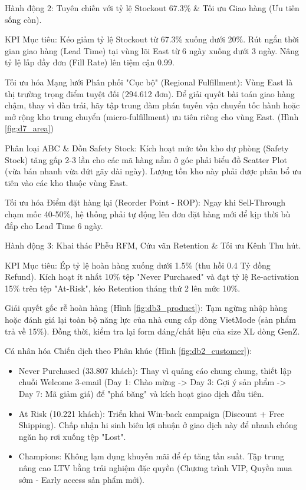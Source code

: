 \documentclass{article}
\begin{document}
Hành động 2: Tuyên chiến với tỷ lệ Stockout 67.3\% \& Tối ưu Giao hàng (Ưu tiên sống còn).

KPI Mục tiêu: Kéo giảm tỷ lệ Stockout từ 67.3\% xuống dưới 20\%. Rút ngắn thời gian giao hàng (Lead Time) tại vùng lõi East từ 6 ngày xuống dưới 3 ngày. Nâng tỷ lệ lấp đầy đơn (Fill Rate) lên tiệm cận 0.99.

Tối ưu hóa Mạng lưới Phân phối "Cục bộ" (Regional Fulfillment): Vùng East là thị trường trọng điểm tuyệt đối (294.612 đơn). Để giải quyết bài toán giao hàng chậm, thay vì dàn trải, hãy tập trung đàm phán tuyến vận chuyển tốc hành hoặc mở rộng kho trung chuyển (micro-fulfillment) ưu tiên riêng cho vùng East. (Hình \ref{fig:d7_area})

Phân loại ABC \& Dồn Safety Stock: Kích hoạt mức tồn kho dự phòng (Safety Stock) tăng gấp 2-3 lần cho các mã hàng nằm ở góc phải biểu đồ Scatter Plot (vừa bán nhanh vừa đứt gãy dài ngày). Lượng tồn kho này phải được phân bổ ưu tiên vào các kho thuộc vùng East.

Tối ưu hóa Điểm đặt hàng lại (Reorder Point - ROP): Ngay khi Sell-Through chạm mốc 40-50\%, hệ thống phải tự động lên đơn đặt hàng mới để kịp thời bù đắp cho Lead Time 6 ngày.

Hành động 3: Khai thác Phễu RFM, Cứu vãn Retention \& Tối ưu Kênh Thu hút.

KPI Mục tiêu: Ép tỷ lệ hoàn hàng xuống dưới 1.5\% (thu hồi 0.4 Tỷ đồng Refund). Kích hoạt ít nhất 10\% tệp "Never Purchased" và đạt tỷ lệ Re-activation 15\% trên tệp "At-Risk", kéo Retention tháng thứ 2 lên mức 10\%.

Giải quyết gốc rễ hoàn hàng (Hình
\ref{fig:db3_product}): Tạm ngừng nhập hàng hoặc đánh giá lại toàn bộ năng lực của nhà cung cấp dòng VietMode (sản phẩm trả về 15\%). Đồng thời, kiểm tra lại form dáng/chất liệu của size XL dòng GenZ.

Cá nhân hóa Chiến dịch theo Phân khúc (Hình \ref{fig:db2_customer}):
\begin{itemize}
\item Never Purchased (33.807 khách): Thay vì quảng cáo chung chung, thiết lập chuỗi Welcome 3-email (Day 1: Chào mừng -> Day 3: Gợi ý sản phẩm -> Day 7: Mã giảm giá) để "phá băng" và kích hoạt giao dịch đầu tiên.

\item At Risk (10.221 khách): Triển khai Win-back campaign (Discount + Free Shipping). Chấp nhận hi sinh biên lợi nhuận ở giao dịch này để nhanh chóng ngăn họ rơi xuống tệp "Lost".

\item Champions: Không lạm dụng khuyến mãi để ép tăng tần suất. Tập trung nâng cao LTV bằng trải nghiệm đặc quyền (Chương trình VIP, Quyền mua sớm - Early access sản phẩm mới).

\end{itemize}
\end{document}

